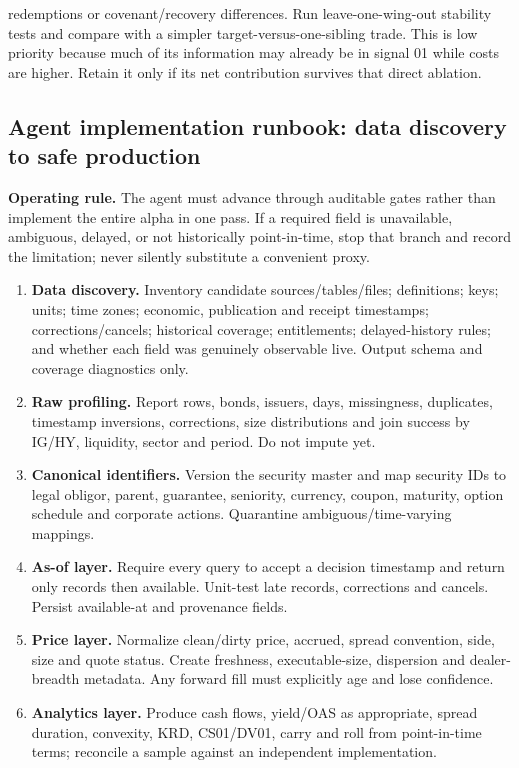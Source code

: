 \documentclass[10pt]{article}
\begin{document}
redemptions or covenant/recovery differences. Run leave-one-wing-out stability tests and compare with a simpler target-versus-one-sibling trade. This is low priority because much of its information may already be in signal 01 while costs are higher. Retain it only if its net contribution survives that direct ablation.
\subsection{Agent implementation runbook: data discovery to safe production}
\textbf{Operating rule.} The agent must advance through auditable gates rather than implement the entire alpha in one pass. If a required field is unavailable, ambiguous, delayed, or not historically point-in-time, stop that branch and record the limitation; never silently substitute a convenient proxy.
\begin{enumerate}[leftmargin=2em,label=\textbf{A\arabic*.}]
\item \textbf{Data discovery.} Inventory candidate sources/tables/files; definitions; keys; units; time zones; economic, publication and receipt timestamps; corrections/cancels; historical coverage; entitlements; delayed-history rules; and whether each field was genuinely observable live. Output schema and coverage diagnostics only.
\item \textbf{Raw profiling.} Report rows, bonds, issuers, days, missingness, duplicates, timestamp inversions, corrections, size distributions and join success by IG/HY, liquidity, sector and period. Do not impute yet.
\item \textbf{Canonical identifiers.} Version the security master and map security IDs to legal obligor, parent, guarantee, seniority, currency, coupon, maturity, option schedule and corporate actions. Quarantine ambiguous/time-varying mappings.
\item \textbf{As-of layer.} Require every query to accept a decision timestamp and return only records then available. Unit-test late records, corrections and cancels. Persist available-at and provenance fields.
\item \textbf{Price layer.} Normalize clean/dirty price, accrued, spread convention, side, size and quote status. Create freshness, executable-size, dispersion and dealer-breadth metadata. Any forward fill must explicitly age and lose confidence.
\item \textbf{Analytics layer.} Produce cash flows, yield/OAS as appropriate, spread duration, convexity, KRD, CS01/DV01, carry and roll from point-in-time terms; reconcile a sample against an independent implementation.

\end{enumerate}
\end{document}

